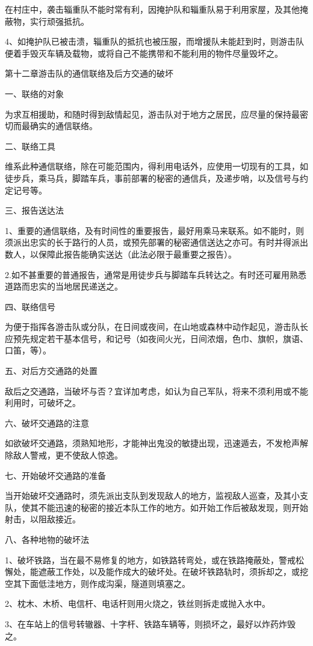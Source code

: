 在村庄中，袭击辎重队不能时常有利，因掩护队和辎重队易于利用家屋，及其他掩蔽物，实行顽强抵抗。

4、如掩护队已被击溃，辎重队的抵抗也被压服，而增援队未能赶到时，则游击队便着手毁灭车辆及载物，或将自己不能携带和不能利用的物件尽量毁坏之。

第十二章游击队的通信联络及后方交通的破坏

一、联络的对象

为求互相援助，和随时得到敌情起见，游击队对于地方之居民，应尽量的保持最密切而最确实的通信联络。

二、联络工具

维系此种通信联络，除在可能范围内，得利用电话外，应使用一切现有的工具，如徒步兵，乘马兵，脚踏车兵，事前部署的秘密的通信兵，及递步哨，以及信号与约定记号等。

三、报告送达法

1、重要的通信联络，及有时间性的重要报告，最好用乘马来联系。如不能时，则须派出忠实的长于路行的人员，或预先部署的秘密通信送达之亦可。有时并得派出数人，以保障此报告能确实送达（此法必限于最重要之报告）。

2.如不甚重要的普通报告，通常是用徒步兵与脚踏车兵转达之。有时还可雇用熟悉道路而忠实的当地居民递送之。

四、联络信号

为便于指挥各游击队或分队，在日间或夜间，在山地或森林中动作起见，游击队长应预先规定若干基本信号，和记号（如夜间火光，日间浓烟，色巾、旗帜，旗语、口笛，等）。


五、对后方交通路的处置

敌后之交通路，当破坏与否？宜详加考虑，如认为自己军队，将来不须利用或不能利用时，可破坏之。

六、破坏交通路的注意

如欲破坏交通路，须熟知地形，才能神出鬼没的敏捷出现，迅速遁去，不发枪声解除敌人警戒，更不使敌人惊逸。

七、开始破坏交通路的准备

当开始破坏交通路时，须先派出支队到发现敌人的地方，监视敌人巡查，及其小支队，使其不能迅速的秘密的接近本队工作的地方。如开始工作后被敌发现，则开始射击，以阻敌接近。

八、各种地物的破坏法

1、破坏铁路，当在最不易修复的地方，如铁路转弯处，或在铁路掩蔽处，警戒松懈处，能遮蔽工作处，以及能作成大的破坏处。在破坏铁路轨时，须拆却之，或挖空其下面低洼地方，则作成沟渠，隧道则填塞之。

2、枕木、木桥、电信杆、电话杆则用火烧之，铁丝则拆走或抛入水中。

3、在车站上的信号转辙器、十字杆、铁路车辆等，则损坏之，最好以炸药炸毁之。

